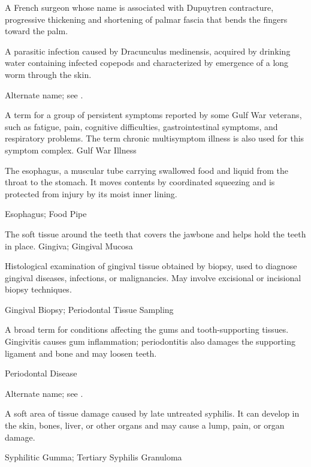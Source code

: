  A French surgeon whose name is associated with Dupuytren contracture, progressive thickening and shortening of palmar fascia that bends the fingers toward the palm.

 A parasitic infection caused by Dracunculus medinensis, acquired by drinking water containing infected copepods and characterized by emergence of a long worm through the skin.

 Alternate name; see .

 A term for a group of persistent symptoms reported by some Gulf War veterans, such as fatigue, pain, cognitive difficulties, gastrointestinal symptoms, and respiratory problems. The term chronic multisymptom illness is also used for this symptom complex.
\synonyms
Gulf War Illness

 The esophagus, a muscular tube carrying swallowed food and liquid from the throat to the stomach. It moves contents by coordinated squeezing and is protected from injury by its moist inner lining.

\synonyms
Esophagus; Food Pipe

 The soft tissue around the teeth that covers the jawbone and helps hold the teeth in place.
\synonyms
Gingiva; Gingival Mucosa

 Histological examination of gingival tissue obtained by biopsy, used to diagnose gingival diseases, infections, or malignancies. May involve excisional or incisional biopsy techniques.

\synonyms
Gingival Biopsy; Periodontal Tissue Sampling

 A broad term for conditions affecting the gums and tooth-supporting tissues. Gingivitis causes gum inflammation; periodontitis also damages the supporting ligament and bone and may loosen teeth.

\synonyms
Periodontal Disease

 Alternate name; see .

 A soft area of tissue damage caused by late untreated syphilis. It can develop in the skin, bones, liver, or other organs and may cause a lump, pain, or organ damage.

\synonyms
Syphilitic Gumma; Tertiary Syphilis Granuloma

